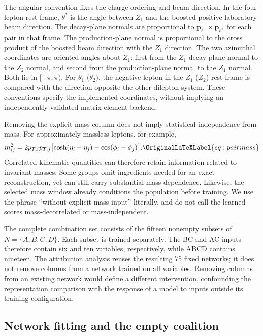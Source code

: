 \documentclass[aps,prd,reprint,superscriptaddress,nofootinbib,longbibliography,floatfix]{revtex4-2}
\let\label\OriginalLaTeXLabel
\begin{document}
The angular convention fixes the charge ordering and beam direction.
In the four-lepton rest frame, $\theta^*$ is the angle between $Z_1$ and
the boosted positive laboratory beam direction. The decay-plane normals
are proportional to $\bm p_{\ell^-}\times\bm p_{\ell^+}$ for each pair
in that frame. The production-plane normal is proportional to the cross
product of the boosted beam direction with the $Z_1$ direction.
The two azimuthal coordinates are oriented angles about $Z_1$: first from
the $Z_1$ decay-plane normal to the $Z_2$ normal, and second from the
production-plane normal to the $Z_1$ normal. Both lie in $[-\pi,\pi)$.
For $\theta_1$ ($\theta_2$), the negative lepton in the $Z_1$ ($Z_2$)
rest frame is compared with the direction opposite the other dilepton
system. These conventions specify the implemented coordinates, without
implying an independently validated matrix-element backend.

Removing the explicit mass column does not imply statistical independence
from mass. For approximately massless leptons, for example,
\begin{equation}
 m_{ij}^{2}=2p_{T,i}p_{T,j}
    \bigl[\cosh(\eta_i-\eta_j)-\cos(\phi_i-\phi_j)\bigr].
 \label{eq:pairmass}
\end{equation}
Correlated kinematic quantities can therefore retain information related to
invariant masses. Some groups omit ingredients needed for an exact
reconstruction, yet can still carry substantial mass dependence. Likewise,
the selected mass window already conditions the population before training.
We use the phrase ``without explicit mass input'' literally, and do not call
the learned scores mass-decorrelated or mass-independent.

The complete combination set consists of the fifteen nonempty subsets of
$N=\{A,B,C,D\}$. Each subset is trained separately. The BC and AC inputs
therefore contain six and ten variables, respectively, while ABCD contains
nineteen. The attribution analysis reuses the resulting 75 fixed networks;
it does not remove columns from a network trained on all variables. Removing
columns from an existing network would define a different intervention,
confounding the representation comparison with the response of a model to
inputs outside its training configuration.

\subsection{Network fitting and the empty coalition}
\end{document}
